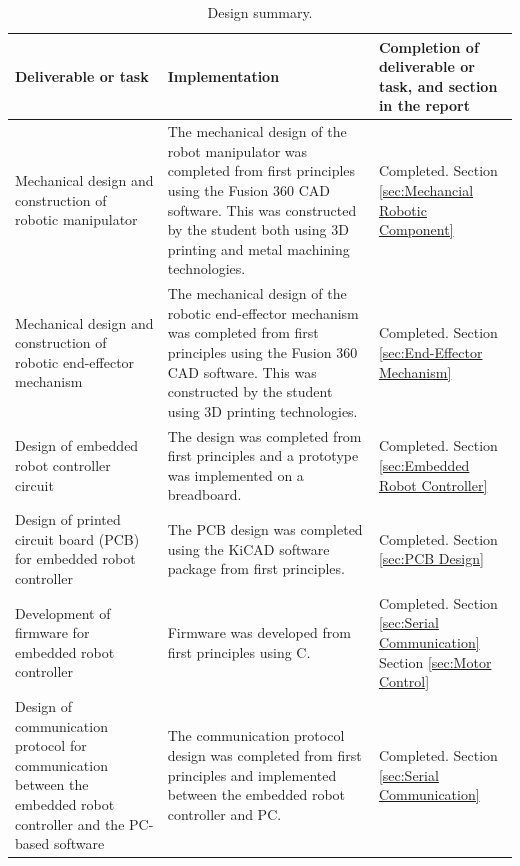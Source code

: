 \begin{table}[H]
	\renewcommand{\arraystretch}{1.3}
	\centering
	\begin{tabular}{|>{\raggedright}m{4.6cm}|>{\raggedright}m{6.6cm}|>{\raggedright\arraybackslash}m{3cm}|}
		\hline
		\textbf{Deliverable or task} & \textbf{Implementation} & \textbf{Completion of deliverable or task, and section in the report} \\
		\hline
		Mechanical design and construction of robotic manipulator & The mechanical design of the robot manipulator was completed from first principles using the Fusion 360 CAD software. This was constructed by the student both using 3D printing and metal machining technologies. & Completed. Section \ref{sec:Mechancial Robotic Component} \\
		\hline
		Mechanical design and construction of robotic end-effector mechanism & The mechanical design of the robotic end-effector mechanism was completed from first principles using the Fusion 360 CAD software. This was constructed by the student using 3D printing technologies. & Completed. Section \ref{sec:End-Effector Mechanism} \\
		\hline
		Design of embedded robot controller circuit & The design was completed from first principles and a prototype was implemented on a breadboard. & Completed. Section \ref{sec:Embedded Robot Controller} \\
		\hline
		Design of printed circuit board (PCB) for embedded robot controller & The PCB design was completed using the KiCAD software package from first principles. & Completed. Section \ref{sec:PCB Design} \\
		\hline
		Development of firmware for embedded robot controller & Firmware was developed from first principles using C. & Completed. Section \ref{sec:Serial Communication} Section \ref{sec:Motor Control} \\
		\hline
		Design of communication protocol for communication between the embedded robot controller and the PC-based software & The communication protocol design was completed from first principles and implemented between the embedded robot controller and PC. & Completed. Section \ref{sec:Serial Communication} \\
		\hline
	\end{tabular}
	\caption{\label{tab:design_summary_p1}Design summary.}
\end{table}

